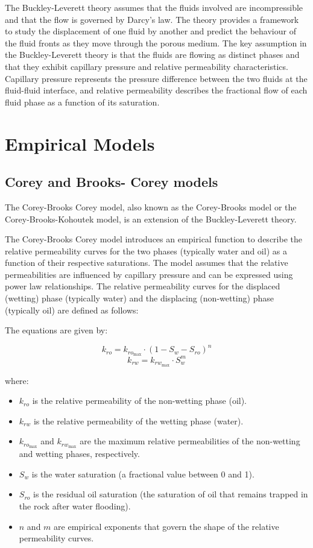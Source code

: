 \documentclass[letterpaper,12pt]{article}
\begin{document}
			
		The Buckley-Leverett theory assumes that the fluids involved are incompressible and that the flow is governed by Darcy's law. The theory provides a framework to study the displacement of one fluid by another and predict the behaviour of the fluid fronts as they move through the porous medium.
		The key assumption in the Buckley-Leverett theory is that the fluids are flowing as distinct phases and that they exhibit capillary pressure and relative permeability characteristics. Capillary pressure represents the pressure difference between the two fluids at the fluid-fluid interface, and relative permeability describes the fractional flow of each fluid phase as a function of its saturation.
		
	
		
	
	

	\section{Empirical Models}
	\subsection{Corey and Brooks- Corey models}

	 The Corey-Brooks Corey model, also known as the Corey-Brooks model or the Corey-Brooks-Kohoutek model, is an extension of the Buckley-Leverett theory.
	 \smallskip
	
	The Corey-Brooks Corey model introduces an empirical function to describe the relative permeability curves for the two phases (typically water and oil) as a function of their respective saturations. The model assumes that the relative permeabilities are influenced by capillary pressure and can be expressed using power law relationships.
	\smallskip
	The relative permeability curves for the displaced (wetting) phase (typically water) and the displacing (non-wetting) phase (typically oil) are defined as follows:
	
 The equations are given by:
 
 \[ k_{ro} = k_{ro_{\text{max}}} \cdot (1 - S_w - S_{ro})^n \]
 \[ k_{rw} = k_{rw_{\text{max}}} \cdot S_w^m \]
 
 where:
 \begin{itemize}
 	\item  \( k_{ro} \) is the relative permeability of the non-wetting phase (oil).
 	 \item\( k_{rw} \) is the relative permeability of the wetting phase (water).
 	\item \( k_{ro_{\text{max}}} \) and \( k_{rw_{\text{max}}} \) are the maximum relative permeabilities of the non-wetting and wetting phases, respectively.
 	\item \( S_w \) is the water saturation (a fractional value between 0 and 1).
 	\item \( S_{ro} \) is the residual oil saturation (the saturation of oil that remains trapped in the rock after water flooding).
 	\item \( n \) and \( m \) are empirical exponents that govern the shape of the relative permeability curves.
 \end{itemize}
\end{document}
